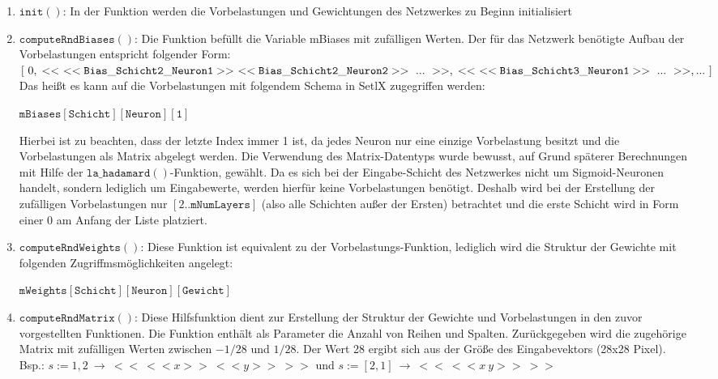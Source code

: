 \begin{enumerate}
\item $\mathtt{init()}$: In der Funktion werden die Vorbelastungen und Gewichtungen des Netzwerkes zu Beginn initialisiert
\item $\mathtt{computeRndBiases()}$: Die Funktion befüllt die Variable mBiases mit zufälligen Werten. Der für das Netzwerk benötigte Aufbau der Vorbelastungen entspricht folgender Form: \\
$[\ 0,\\ 
<<\ <<\mathtt{Bias\_Schicht2\_Neuron1}>>\ <<\mathtt{Bias\_Schicht2\_Neuron2}>>\ ...\ >>, \\
<<\ <<\mathtt{Bias\_Schicht3\_Neuron1}>>\ ...\ >>, \\
 ...\ ]$ \\
Das heißt es kann auf die Vorbelastungen mit folgendem Schema in SetlX zugegriffen werden: \\
\begin{center}
	$\mathtt{mBiases[Schicht][Neuron][1]}$
\end{center}
Hierbei ist zu beachten, dass der letzte Index immer 1 ist, da jedes Neuron nur eine einzige Vorbelastung besitzt und die Vorbelastungen als Matrix abgelegt werden. Die Verwendung des Matrix-Datentyps wurde bewusst, auf Grund späterer Berechnungen mit Hilfe der $\mathtt{la\_hadamard()}$-Funktion, gewählt. Da es sich bei der Eingabe-Schicht des Netzwerkes nicht um Sigmoid-Neuronen handelt, sondern lediglich um Eingabewerte, werden hierfür keine Vorbelastungen benötigt. Deshalb wird bei der Erstellung der zufälligen Vorbelastungen nur $[2..\mathtt{mNumLayers}]$ (also alle Schichten außer der Ersten) betrachtet und die erste Schicht wird in Form einer 0 am Anfang der Liste platziert.
\item $\mathtt{computeRndWeights()}$: Diese Funktion ist equivalent zu der Vorbelastungs-Funktion, lediglich wird die Struktur der Gewichte mit folgenden Zugriffmsmöglichkeiten angelegt: \\
\begin{center}
	$\mathtt{mWeights[Schicht][Neuron][Gewicht]}$
\end{center}
\item $\mathtt{computeRndMatrix()}$: Diese Hilfsfunktion dient zur Erstellung der Struktur der Gewichte und Vorbelastungen in den zuvor vorgestellten Funktionen. Die Funktion enthält als Parameter die Anzahl von Reihen und Spalten. Zurückgegeben wird die zugehörige Matrix mit zufälligen Werten zwischen $-1/28$ und $1/28$. Der Wert 28 ergibt sich aus der Größe des Eingabevektors (28x28 Pixel). \\
Bsp.: $s := 1, 2\ \rightarrow\ <<\ <<x>>\ <<y>>\ >>$ und $s := [2,1]\ \rightarrow\ <<\ <<x\ y>>\ >>$
\end{enumerate}


